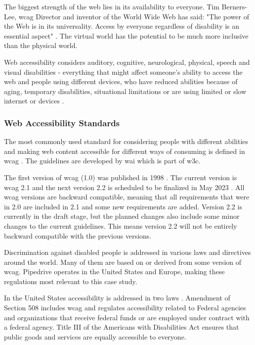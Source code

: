 \documentclass{master_thesis}
\begin{document}
The biggest strength of the web lies in its availability to everyone. Tim Berners-Lee, \ac{wcag} Director and inventor of the World Wide Web has said: "The power of the Web is in its universality. Access by everyone regardless of disability is an essential aspect" \citep{WWWC1997}. The virtual world has the potential to be much more inclusive than the physical world.

Web accessibility considers auditory, cognitive, neurological, physical, speech and visual disabilities - everything that might affect someone's ability to access the web and people using different devices, who have reduced abilities because of aging, temporary disabilities, situational limitations or are using limited or slow internet or devices \citep{Henry2022}.

\subsubsection{Web Accessibility Standards}

The most commonly used standard for considering people with different abilities and making web content accessible for different ways of consuming is defined in \ac{wcag} \citep{Kirkpatrick2018}. The guidelines are developed by \ac{wai} which is part of \ac{w3c}.

The first version of \ac{wcag} (1.0) was published in 1998 \citep{Vanderheiden1998}. The current version is \ac{wcag} 2.1 and the next version 2.2 is scheduled to be finalized in May 2023 \citep{Henry2023}. All \ac{wcag} versions are backward compatible, meaning that all requirements that were in 2.0 are included in 2.1 and some new requirements are added. Version 2.2 is currently in the draft stage, but the planned changes also include some minor changes to the current guidelines. This means version 2.2 will not be entirely backward compatible with the previous versions.

Discrimination against disabled people is addressed in various laws and directives around the world. Many of them are based on or derived from some version of \ac{wcag}. Pipedrive operates in the United States and Europe, making these regulations most relevant to this case study.

In the United States accessibility is addressed in two laws \citep{Siteimprove}. Amendment of Section 508 includes \ac{wcag} and regulates accessibility related to Federal agencies and organizations that receive federal funds or are employed under contract with a federal agency. Title III of the Americans with Disabilities Act ensures that public goods and services are equally accessible to everyone.
\end{document}
